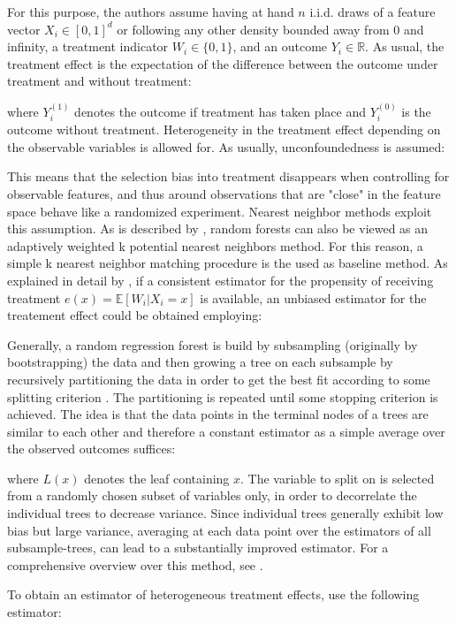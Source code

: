 \documentclass[11pt, a4paper, leqno]{article}
\begin{document}
For this purpose, the authors assume having at hand \(n\) i.i.d. draws of a feature vector \(X_i \in [0,1]^d\) or following any other density bounded away from 0 and infinity, a treatment indicator \(W_i \in \{0,1\}\), and an outcome \(Y_i \in \mathbb{R}\).
As usual, the treatment effect is the expectation of the difference between the outcome under treatment and without treatment:

where \(Y_i^{(1)}\) denotes the outcome if treatment has taken place and \(Y_i^{(0)}\) is the outcome without treatment. Heterogeneity in the treatment effect depending on the observable variables is allowed for. 
As usually, unconfoundedness is assumed:

This means that the selection bias into treatment disappears when controlling for observable features, and thus around observations that are "close" in the feature space behave like a randomized experiment. 
Nearest neighbor methods exploit this assumption. As is described by \citet{lj06}, random forests can also be viewed as an adaptively weighted k potential nearest neighbors method. For this reason, a simple k nearest neighbor matching procedure is the used as baseline method.
As explained in detail by \citet{hir03}, if a consistent estimator for the propensity of receiving treatment \(e(x) = \mathbb{E}[W_i|X_i = x]\)  is available, an unbiased estimator for the treatement effect could be obtained employing: 


Generally, a random regression forest is build by subsampling (originally by bootstrapping) the data and then growing a tree on each subsample by recursively partitioning the data in order to get the best fit according to some splitting criterion \citep[p.~304 ff.]{htf08}. The partitioning is repeated until some stopping criterion is achieved. The idea is that the data points in the terminal nodes of a trees are similar to each other and therefore a constant estimator as a simple average over the observed outcomes suffices:

where \(L(x)\) denotes the leaf containing \(x\).
The variable to split on is selected from a randomly chosen subset of variables only, in order to decorrelate the individual trees to decrease variance. Since individual trees generally exhibit low bias but large variance, averaging at each data point over the estimators of all subsample-trees, can lead to a substantially improved estimator. 
For a comprehensive overview over this method, see \cite[p.~587 ff.]{htf08}.

To obtain an estimator of heterogeneous treatment effects, \cite{wa18} use the following estimator:

\end{document}
